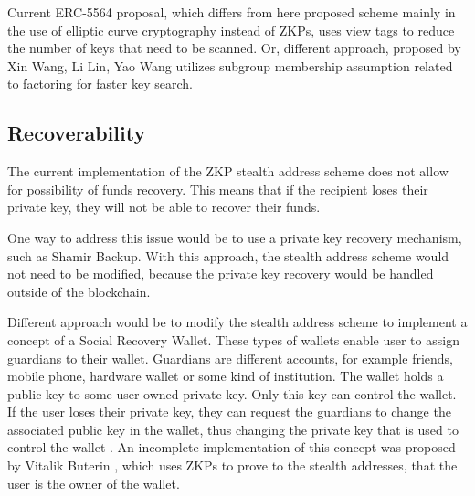 Current ERC-5564 \cite{ethereumERC5564Stealth} proposal, which differs from
here proposed scheme mainly in the use of elliptic curve cryptography instead
of ZKPs, uses view tags to reduce the number of keys that need to be scanned.
Or, different approach, proposed by Xin Wang, Li Lin, Yao Wang \cite{Wang2023}
utilizes subgroup membership assumption related to factoring for faster key
search.

\subsection*{Recoverability}

The current implementation of the ZKP stealth address scheme does not allow for
possibility of funds recovery. This means that if the recipient loses their
private key, they will not be able to recover their funds.

One way to address this issue would be to use a private key recovery
mechanism, such as Shamir Backup. With this approach, the stealth address
scheme would not need to be modified, because the private key recovery would
be handled outside of the blockchain.

Different approach would be to modify the stealth address scheme to implement
a concept of a Social Recovery Wallet. These types of wallets enable user to
assign guardians to their wallet. Guardians are different accounts, for example
friends, mobile phone, hardware wallet or some kind of institution. The wallet
holds a public key to some user owned private key. Only this key can control
the wallet. If the user loses their private key, they can request the
guardians to change the associated public key in the wallet, thus changing the
private key that is used to control the wallet \cite{ButerinSocialRecovery}.
An incomplete implementation of this concept was proposed by Vitalik Buterin \cite{ButerinIncompleteGuide},
which uses ZKPs to prove to the stealth addresses, that the user is the owner
of the wallet.


